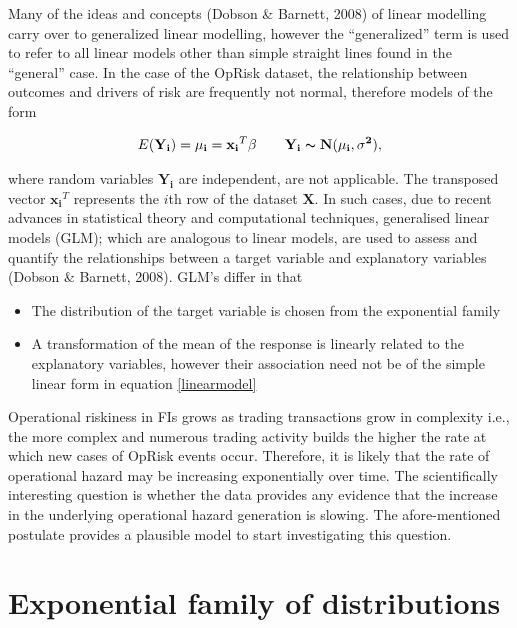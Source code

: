 \documentclass{DissertateUSU}
\begin{document}
Many of the ideas and concepts (Dobson \& Barnett, 2008) of linear
modelling carry over to generalized linear modelling, however the
``generalized'' term is used to refer to all linear models other than
simple straight lines found in the ``general'' case. In the case of the
OpRisk dataset, the relationship between outcomes and drivers of risk
are frequently not normal, therefore models of the form

\singlespacing

\begin{eqnarray}\label{linearmodel}
E(\mathbf{Y_i}) = \mathbf{\mu_i} = \mathbf{x_i}^T\mathbf{\beta} \qquad \mathbf{Y_i} \thicksim \mathbf{N(\mu_i, \sigma^2)},
\end{eqnarray} \doublespacing

where random variables \(\mathbf{Y_i}\) are independent, are not
applicable. The transposed vector \(\mathbf{x_i}^T\) represents the
\(i\)th row of the dataset \(\mathbf{X}\). In such cases, due to recent
advances in statistical theory and computational techniques, generalised
linear models (GLM); which are analogous to linear models, are used to
assess and quantify the relationships between a target variable and
explanatory variables (Dobson \& Barnett, 2008). GLM's differ in that

\begin{itemize}
\item The distribution of the target variable is chosen from the exponential family
\item A transformation of the mean of the response is linearly related to the explanatory variables, however their association need not be of the simple linear form in equation \ref{linearmodel}
\end{itemize}
\medskip

Operational riskiness in FIs grows as trading transactions grow in
complexity i.e., the more complex and numerous trading activity builds
the higher the rate at which new cases of OpRisk events occur.
Therefore, it is likely that the rate of operational hazard may be
increasing exponentially over time. The scientifically interesting
question is whether the data provides any evidence that the increase in
the underlying operational hazard generation is slowing. The
afore-mentioned postulate provides a plausible model to start
investigating this question.\medskip

\section{Exponential family of distributions}
\label{sec: Exponential family of distributions}
\end{document}
